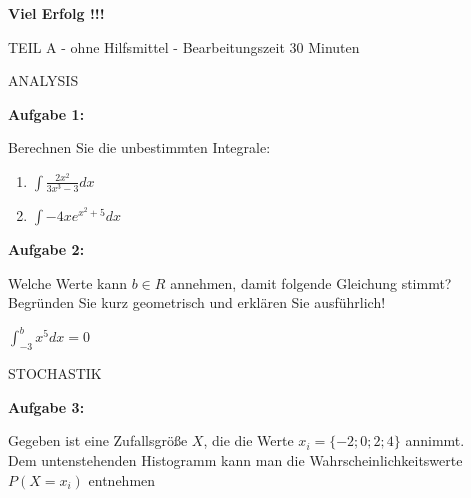 \documentclass[a4paper,12pt]{article}
\newcommand{\Aufgabe}[1]{
  {
  \vspace*{0.5cm}
  \textsf{\textbf{Aufgabe #1}}
  \vspace*{0.2cm}
  
  }
}
\begin{document}
\vspace{5cm}
\centerline{\huge\bfseries\sffamily Viel Erfolg !!!}

\newpage

\begin{center}
\vspace{0,5cm} {TEIL A} - ohne Hilfsmittel - Bearbeitungszeit 30 Minuten
\end{center}
\vspace {0,8cm}

ANALYSIS

\Aufgabe{1:} 
Berechnen Sie die unbestimmten Integrale:

\begin{enumerate}[label={\alph*)}]
  \item $ \int \frac{2x^2}{3x^3-3} dx $
  \item $ \int -4xe^{x^2+5} dx $
\end{enumerate}
\Aufgabe{2:}
Welche Werte kann $ b \in R$ annehmen, damit folgende Gleichung stimmt? Begründen Sie kurz geometrisch und erklären Sie ausführlich!

 $ \int_ {-3}^{b} x^5 dx =0$

\vspace{2cm}
STOCHASTIK

\Aufgabe{3:}
Gegeben ist eine Zufallsgröße $X$, die die Werte $x_i = \{-2; 0; 2; 4\}$ annimmt.\\
Dem untenstehenden Histogramm kann man die Wahrscheinlichkeitswerte $P(X = x_i)$ entnehmen
\end{document}
